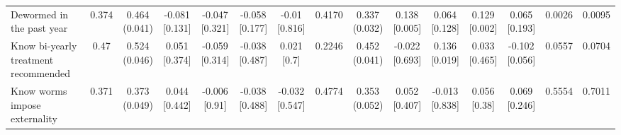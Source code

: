 \documentclass[
]{article}
\begin{document}
\begin{table}[htbp]
{\begin{tabular}[t]{lcccccccccccccc}
\hspace{1em}Dewormed in the past year & 0.374 & \makecell[c]{0.464\\(0.041)} & \makecell[c]{-0.081\\{[0.131]}} & \makecell[c]{-0.047\\{[0.321]}} & \makecell[c]{-0.058\\{[0.177]}} & \makecell[c]{-0.01\\{[0.816]}} & 0.4170 & \makecell[c]{0.337\\(0.032)} & \makecell[c]{0.138\\{[0.005]}} & \makecell[c]{0.064\\{[0.128]}} & \makecell[c]{0.129\\{[0.002]}} & \makecell[c]{0.065\\{[0.193]}} & 0.0026 & 0.0095\\
\hspace{1em}Know bi-yearly treatment recommended & 0.47 & \makecell[c]{0.524\\(0.046)} & \makecell[c]{0.051\\{[0.374]}} & \makecell[c]{-0.059\\{[0.314]}} & \makecell[c]{-0.038\\{[0.487]}} & \makecell[c]{0.021\\{[0.7]}} & 0.2246 & \makecell[c]{0.452\\(0.041)} & \makecell[c]{-0.022\\{[0.693]}} & \makecell[c]{0.136\\{[0.019]}} & \makecell[c]{0.033\\{[0.465]}} & \makecell[c]{-0.102\\{[0.056]}} & 0.0557 & 0.0704\\
\hspace{1em}Know worms impose externality & 0.371 & \makecell[c]{0.373\\(0.049)} & \makecell[c]{0.044\\{[0.442]}} & \makecell[c]{-0.006\\{[0.91]}} & \makecell[c]{-0.038\\{[0.488]}} & \makecell[c]{-0.032\\{[0.547]}} & 0.4774 & \makecell[c]{0.353\\(0.052)} & \makecell[c]{0.052\\{[0.407]}} & \makecell[c]{-0.013\\{[0.838]}} & \makecell[c]{0.056\\{[0.38]}} & \makecell[c]{0.069\\{[0.246]}} & 0.5554 & 0.7011\\

\end{tabular}}
\end{table}
\end{document}
